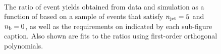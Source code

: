 \begin{figure}[h!]
\begin{center}
    \\
    \caption{The ratio of event yields obtained from data and simulation as a function of \mht [GeV] based on a sample of \mj events that satisfy $n_{\text{jet}} = 5$ and $n_{\text{b}} = 0$, as well as the requirements on \scalht indicated by each sub-figure caption. Also shown are fits to the ratios using first-order orthogonal polynomials.}
    \label{fig:mhtval_Mu_eq5j_eq0b}
  \end{center}
\end{figure}

